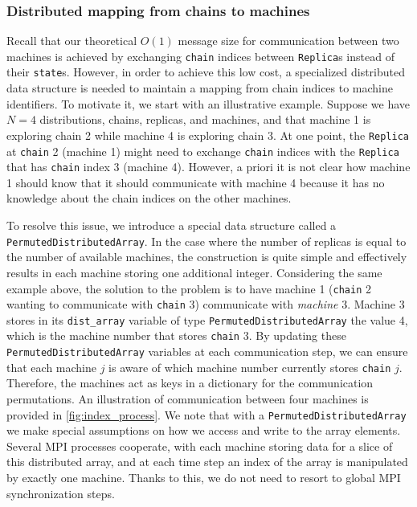 \subsubsection{Distributed mapping from chains to machines}
\label{sec:permuted_dist_array}
Recall that our theoretical $O(1)$ message size for communication between two machines 
is achieved by exchanging \texttt{chain} indices between \texttt{Replica}s 
instead of their \texttt{state}s. 
However, in order to achieve this low cost, a specialized distributed data structure is 
needed to maintain a mapping from chain indices to machine identifiers. 
To motivate it, we start with an illustrative example. 
Suppose we have $N=4$ distributions, chains, replicas, and machines, and that 
machine 1 is exploring chain 2 while machine 4 is exploring chain 3.
At one point, the \texttt{Replica} at \texttt{chain} 2 (machine 1) might need to exchange
\texttt{chain} indices with the \texttt{Replica} that has \texttt{chain} index 3 (machine 4). 
However, a priori it is not clear how machine 1 should know that it should communicate 
with machine 4 because it has no knowledge about the chain indices on the other machines.

\medskip 
To resolve this issue, we introduce a special data structure called a 
\texttt{PermutedDistributedArray}. In the case where the number of replicas is 
equal to the number of available machines, the construction is quite simple
and effectively results in each machine storing one additional integer. 
Considering the same example above, the solution to the problem is to have
machine 1 (\texttt{chain} 2 wanting to communicate with \texttt{chain} 3) 
communicate with \textit{machine} 3. 
Machine 3 stores in its \texttt{dist\_array} variable of type 
\texttt{PermutedDistributedArray} the value 4, which is the machine number that 
stores \texttt{chain} 3. By updating these \texttt{PermutedDistributedArray} 
variables at each communication step, we can ensure that each machine $j$ is aware 
of which machine number currently stores \texttt{chain} $j$. 
Therefore, the machines act as keys in a dictionary for the communication 
permutations.
An illustration of communication between four machines is provided in 
\cref{fig:index_process}.
We note that with a \texttt{PermutedDistributedArray} we make special assumptions 
on how we access and write to the array elements. 
Several MPI processes cooperate, with each machine storing 
data for a slice of this distributed array, and at each time 
step an index of the array is manipulated by exactly one machine. 
Thanks to this, we do not need to resort to global MPI synchronization steps. 

